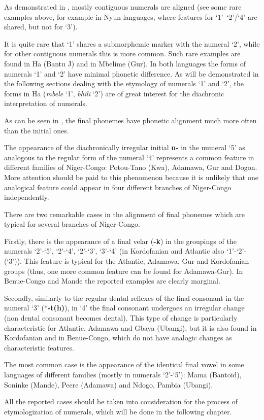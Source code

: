 As demonstrated in , mostly contiguous numerals are aligned (see some rare examples above, for example in Nyun languages, where features for ‘1’–‘2’/‘4’ are shared, but not for `3'). 

It is quite rare that ‘1’ shares a submorphemic marker with the numeral ‘2’, while for other contiguous numerals this is more common.  Such rare examples are found in Ha (Bantu J) and in Mbelime (Gur). In both languages the forms of numerals ‘1’ and ‘2’ have minimal phonetic difference. As will be demonstrated in the following sections dealing with the etymology of numerals ‘1’ and ‘2’, the forms in Ha (\textit{mbele} ‘1’, \textit{bhili} ‘2’) are of great interest for the diachronic interpretation of numerals.

As can be seen in , the final phonemes have phonetic alignment much more often than the initial ones. 

The appearance of the diachronically irregular initial \textbf{n-} in the numeral ‘5’ as analogous to the regular form of the numeral ‘4’ represents a common feature in different families of Niger-Congo: Potou-Tano (Kwa), Adamawa, Gur and Dogon. More attention should be paid to this phenomenon because it is unlikely that one analogical feature could appear in four different branches of Niger-Congo independently. 

There are two remarkable cases in the alignment of final phonemes which are typical for several branches of Niger-Congo. 

Firstly, there is the appearance of a final velar (\textbf{-k}) in the groupings of the numerals ‘2’-‘5’, ‘2’-‘4’, ‘2’-‘3’, ‘3’-‘4’ (in Kordofanian and Atlantic also ‘1’-‘2’-(‘3’)).  This feature is typical for the Atlantic, Adamawa, Gur and Kordofanian groups (thus, one more common feature can be found for Adamawa-Gur). In Benue-Congo and Mande the reported examples are clearly marginal. 

Secondly, similarly to the regular dental reflexes of the final consonant in the numeral ‘3’ (*\textbf{-t(h)}), in ‘4’ the final consonant undergoes an irregular change (non dental consonant becomes dental). This type of change is particularly characteristic for Atlantic, Adamawa and Gbaya (Ubangi), but it is also found in Kordofanian and in Benue-Congo, which do not have analogic changes as characteristic features. 

\largerpage
The most common case is the appearance of the identical final vowel in some languages of different families (mostly in numerals ‘2’-‘5’): Mama (Bantoid), So\-nin\-ke (Mande), Peere (Adamawa) and Ndogo, Pambia (Ubangi).

All the reported cases should be taken into consideration for the process of etymologization of numerals, which will be done in the following chapter. 

